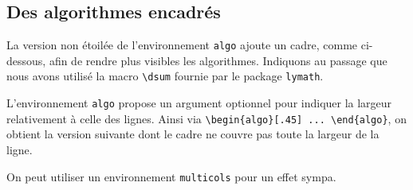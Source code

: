 \documentclass[12pt,a4paper]{article}
\begin{document}

\subsection{Des algorithmes encadrés}

La version non étoilée de l'environnement \verb+algo+ ajoute un cadre, comme ci-dessous, afin de rendre plus visibles les algorithmes. Indiquons au passage que nous avons utilisé la macro \verb+\dsum+ fournie par le package \verb+lymath+.



\vspace{-1em}


L'environnement \verb+algo+ propose un argument optionnel pour indiquer la largeur relativement à celle des lignes.
Ainsi  via \verb+\begin{algo}[.45] ... \end{algo}+, on obtient la version suivante dont le cadre ne couvre pas toute la largeur de la ligne.





\medskip


On peut utiliser un environnement \verb+multicols+ pour un effet sympa.

\begin{multicols}{2}




\end{multicols}
\end{document}
